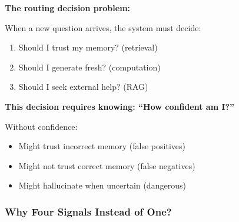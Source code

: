 \documentclass[12pt,a4paper]{article}
\theoremstyle{definition}
\begin{document}
\begin{problembox}
\textbf{The routing decision problem:}

When a new question arrives, the system must decide:
\begin{enumerate}
    \item Should I trust my memory? (retrieval)
    \item Should I generate fresh? (computation)
    \item Should I seek external help? (RAG)
\end{enumerate}

\textbf{This decision requires knowing: ``How confident am I?''}

Without confidence:
\begin{itemize}
    \item Might trust incorrect memory (false positives)
    \item Might not trust correct memory (false negatives)
    \item Might hallucinate when uncertain (dangerous)
\end{itemize}
\end{problembox}

\subsubsection{Why Four Signals Instead of One?}
\end{document}
